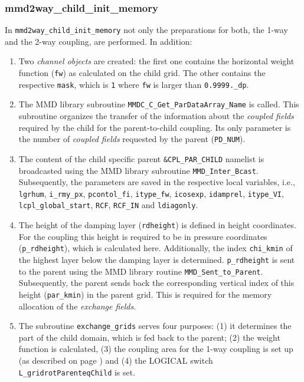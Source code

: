 \documentclass[11pt,twoside]{article}
\begin{document}
\subsubsection{mmd2way\_child\_init\_memory}
In \verb|mmd2way_child_init_memory| not only the preparations for
both, the 1-way and 
the 2-way coupling, are performed. In addition:
\begin{enumerate}
\item Two {\it channel objects} are created: the
first one contains the horizontal weight function (\verb|fw|)
 as calculated on the child grid. The other contains the respective 
\verb|mask|, which is \verb|1| where \verb|fw| is larger
than \verb|0.9999._dp|.
\item  The MMD library  subroutine \verb|MMDC_C_Get_ParDataArray_Name|
is called. This subroutine organizes the transfer of the information about the
 {\it coupled fields} required by the child for the parent-to-child
 coupling. 
 Its only parameter is the number of {\it coupled fields} requested by the
 parent (\verb|PD_NUM|).
\item The content of the child specific parent \verb|&CPL_PAR_CHILD|
 namelist is broadcasted using the MMD library
 subroutine \verb|MMD_Inter_Bcast|. Subsequently, the parameters are saved in
 the respective local variables, i.e., \verb|lgrhum|, \verb|i_rmy_px|, 
\verb|pcontol_fi|, \verb|itype_fw|, \verb|icosexp|, \verb|idamprel|, 
\verb|itype_VI|, \verb|lcpl_global_start|, \verb|RCF|, \verb|RCF_IN| and
\verb|ldiagonly|. 
\item The height of the damping layer (\verb|rdheight|) is defined in height 
 coordinates. For the coupling this height is required to be in pressure
 coordinates (\verb|p_rdheight|), which is calculated here. Additionally, the
 index \verb|chi_kmin| of the highest layer below the damping layer 
is determined. \verb|p_rdheight| is sent to the parent using the MMD 
library routine \verb|MMD_Sent_to_Parent|. Subsequently, the parent
 sends back the corresponding vertical index of this height (\verb|par_kmin|)
in the parent grid. This is required for the memory allocation of the 
{\it exchange fields}.
\item The subroutine \verb|exchange_grids| serves four purposes: (1)
 it determines the part of the child domain, which is fed back to the
 parent; (2) the weight 
 function is calculated, (3) the coupling area for the 1-way
 coupling is set up (as described on page \pageref{SR:exchange_grids})
and (4) the {\footnotesize LOGICAL}
 switch \verb|L_gridrotParenteqChild|
is set.


\end{enumerate}
\end{document}
